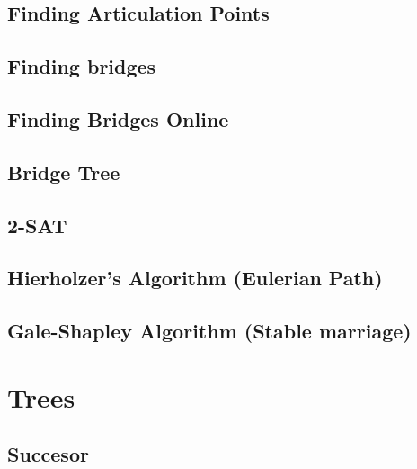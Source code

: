 \documentclass[10pt]{article}
\begin{document}
\begin{multicols*}{2}
\subsection{Finding Articulation Points}


\subsection{Finding bridges}


\subsection{Finding Bridges Online}


\subsection{Bridge Tree}



\subsection{2-SAT}


\subsection{Hierholzer's Algorithm (Eulerian Path)}


\subsection{Gale-Shapley Algorithm (Stable marriage)}


\section{Trees}

\subsection{Succesor}



\end{multicols*}
\end{document}
